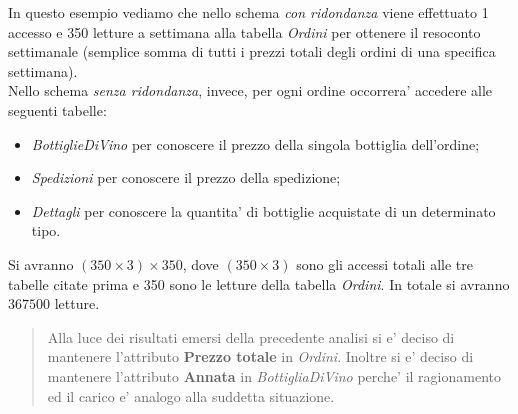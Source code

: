 \begin{flushleft}
In questo esempio vediamo che nello schema \emph{con ridondanza} viene effettuato 1 accesso e 350 letture a settimana alla tabella \emph{Ordini} per ottenere il resoconto settimanale (semplice somma di tutti i prezzi totali degli ordini di una specifica settimana).\\
\vspace{0.5cm}
Nello schema \emph{senza ridondanza}, invece, per ogni ordine occorrera' accedere alle seguenti tabelle:
\begin{itemize}
	\item \emph{BottiglieDiVino} per conoscere il prezzo della singola bottiglia dell'ordine;
	\item \emph{Spedizioni} per conoscere il prezzo della spedizione;
	\item \emph{Dettagli} per conoscere la quantita' di bottiglie acquistate di un determinato tipo.
\end{itemize}
Si avranno $(350\times3)\times350$, dove $(350\times3)$ sono gli accessi totali alle tre tabelle citate prima e 350 sono le letture della tabella \emph{Ordini}. In totale si avranno $367500$ letture.\\
\begin{verse}
	Alla luce dei risultati emersi della precedente analisi si e' deciso di mantenere l'attributo \textbf{Prezzo totale} in \emph{Ordini}. Inoltre si e' deciso di mantenere l'attributo \textbf{Annata} in \emph{BottigliaDiVino} perche' il ragionamento ed il carico e' analogo alla suddetta situazione.
\end{verse} 
\end{flushleft}
